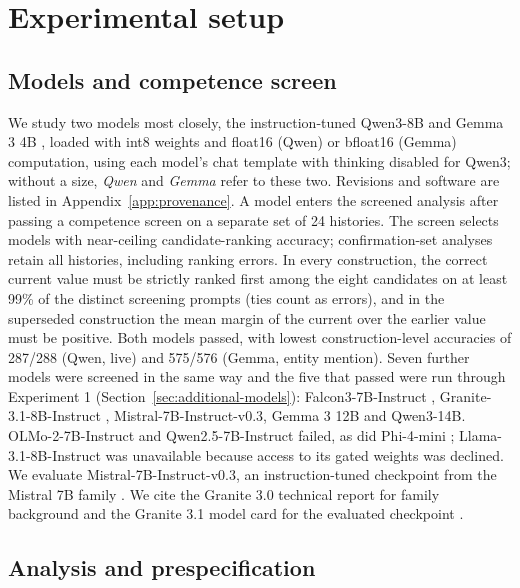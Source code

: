 \section{Experimental setup}
\label{sec:setup}

\subsection{Models and competence screen}
\label{sec:models}

We study two models most closely, the instruction-tuned Qwen3-8B \citep{yang2025qwen3} and Gemma 3 4B \citep{gemma2025gemma3}, loaded with int8 weights \citep{dettmers2022llmint8} and float16 (Qwen) or bfloat16 (Gemma) computation, using each model's chat template with thinking disabled for Qwen3; without a size, \emph{Qwen} and \emph{Gemma} refer to these two. Revisions and software are listed in Appendix~\ref{app:provenance}. A model enters the screened analysis after passing a competence screen on a separate set of 24 histories. The screen selects models with near-ceiling candidate-ranking accuracy; confirmation-set analyses retain all histories, including ranking errors. In every construction, the correct current value must be strictly ranked first among the eight candidates on at least 99\% of the distinct screening prompts (ties count as errors), and in the superseded construction the mean margin of the current over the earlier value must be positive. Both models passed, with lowest construction-level accuracies of 287/288 (Qwen, live) and 575/576 (Gemma, entity mention). Seven further models were screened in the same way and the five that passed were run through Experiment 1 (Section~\ref{sec:additional-models}): Falcon3-7B-Instruct \citep{tii2024falcon3}, Granite-3.1-8B-Instruct \citep{granite2024granite31,granite2024granite3}, Mistral-7B-Instruct-v0.3, Gemma 3 12B and Qwen3-14B. OLMo-2-7B-Instruct \citep{olmo2025olmo2} and Qwen2.5-7B-Instruct \citep{qwen2025qwen25} failed, as did Phi-4-mini \citep{abouelenin2025phi4mini}; Llama-3.1-8B-Instruct was unavailable because access to its gated weights was declined. We evaluate Mistral-7B-Instruct-v0.3, an instruction-tuned checkpoint from the Mistral 7B family \citep{jiang2023mistral,mistralai2024mistral03}. We cite the Granite 3.0 technical report for family background \citep{granite2024granite3} and the Granite 3.1 model card for the evaluated checkpoint \citep{granite2024granite31}.

\subsection{Analysis and prespecification}
\label{sec:inference}

